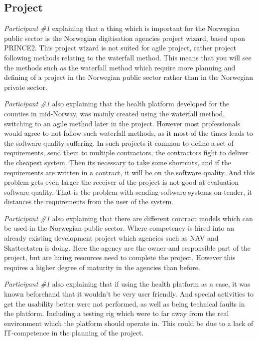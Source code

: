 \subsection{Project}
\textit{Participant \#1} explaining that a thing which is important for the Norwegian public sector is the Norwegian digitisation agencies project wizard, based upon PRINCE2. This project wizard is not suited for agile project, rather project following methods relating to the waterfall method. This means that you will see the methods such as the waterfall method which require more planning and defining of a project in the Norwegian public sector rather than in the Norwegian private sector.

\textit{Participant \#1} also explaining that the health platform developed for the counties in mid-Norway, was mainly created using the waterfall method, switching to an agile method later in the project. However most professionals would agree to not follow such waterfall methods, as it most of the times leads to the software quality suffering. In such projects it common to define a set of requirements, send them to multiple contractors, the contractors fight to deliver the cheapest system. Then its necessary to take some shortcuts, and if the requirements are written in a contract, it will be on the software quality. And this problem gets even larger the receiver of the project is not good at evaluation software quality. That is the problem with sending software systems on tender, it distances the requirements from the user of the system.

\textit{Participant \#1} also explaining that there are different contract models which can be used in the Norwegian public sector. Where competency is hired into an already existing development project which agencies such as NAV and Skatteetaten is doing. Here the agency are the owner and responsible part of the project, but are hiring resources need to complete the project. However this requires a higher degree of maturity in the agencies than before.

\textit{Participant \#1} also explaining that if using the health platform as a case, it was known beforehand that it wouldn't be very user friendly. And special activities to get the usability better were not performed, as well as being technical faults in the platform. Including a testing rig which were to far away from the real environment which the platform should operate in. This could be due to a lack of IT-competence in the planning of the project.

